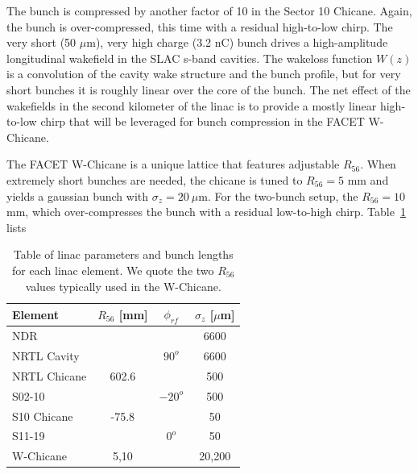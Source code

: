 \documentclass[%
twocolumn,
showpacs,preprintnumbers,
 aps,
prstab,
]{revtex4-1}
\begin{document}
The bunch is compressed by another factor of 10 in the Sector 10 Chicane. Again, the bunch is over-compressed, this time with a residual high-to-low chirp. The very short (50 $\mu$m), very high charge (3.2 nC) bunch drives a high-amplitude longitudinal wakefield in the SLAC s-band cavities. The wakeloss function $W(z)$ is a convolution of the cavity wake structure and the bunch profile, but for very short bunches it is roughly linear over the core of the bunch. The net effect of the wakefields in the second kilometer of the linac is to provide a mostly linear high-to-low chirp that will be leveraged for bunch compression in the FACET W-Chicane.

The FACET W-Chicane is a unique lattice that features adjustable $R_{56}$.  When extremely short bunches are needed, the chicane is tuned to $R_{56} = 5$ mm and yields a gaussian bunch with $\sigma_z = 20~\mu$m. For the two-bunch setup, the $R_{56} = 10$ mm, which over-compresses the bunch with a residual low-to-high chirp. Table~\ref{dat_table} lists 

\begin{table}
  \begin{tabular}{ l c c c}
    \hline
    Element & $R_{56}$ [mm] & $\phi_{rf}$ & $\sigma_z$ [$\mu$m] \\ \hline
    NDR &  & & 6600 \\
    NRTL Cavity &  & $ 90^o$ & 6600 \\
    NRTL Chicane & 602.6 & & 500 \\
    S02-10 &  & $-20^o$ & 500 \\
    S10 Chicane & -75.8 & & 50 \\
    S11-19 & & $0^o$ & 50 \\
    W-Chicane & 5,10 & & 20,200 \\
    \hline
  \end{tabular}
   \caption{Table of linac parameters and bunch lengths for each linac element. We quote the two $R_{56}$ values typically used in the W-Chicane.}
   \label{dat_table}
\end{table}

\end{document}
